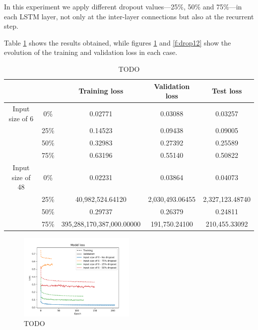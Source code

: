 \documentclass[]{article}
\begin{document}
In this experiment we apply different dropout values---25\%, 50\% and 75\%---in each LSTM layer, not only at the inter-layer connections but also at the recurrent step.

Table \ref{t:drop1} shows the results obtained, while figures \ref{f:drop11} and \ref{f:drop12} show the evolution of the training and validation loss in each case.

\begin{table}[H]
	\centering
	\begin{tabular}{@{}ccccc@{}}
		\toprule
		&      & Training loss             & Validation loss & Test loss       \\ \midrule
		Input size of 6  & 0\%  & 0.02771                   & 0.03088         & 0.03257         \\
		& 25\% & 0.14523                   & 0.09438         & 0.09005         \\
		& 50\% & 0.32983                   & 0.27392         & 0.25589         \\
		& 75\% & 0.63196                   & 0.55140         & 0.50822         \\
		\midrule
		Input size of 48 & 0\%  & 0.02231                   & 0.03864         & 0.04073         \\
		& 25\% & 40,982,524.64120          & 2,030,493.06455 & 2,327,123.48740 \\
		& 50\% & 0.29737                   & 0.26379         & 0.24811         \\
		& 75\% & 395,288,170,387,000.00000 & 191,750.24100   & 210,455.33092   \\ \bottomrule
	\end{tabular}
	\caption{TODO}
	\label{t:drop1}
\end{table}

\begin{figure}[H]
	\centering
	\includegraphics[width=0.5\textwidth]{drop11}
	\caption{TODO}
	\label{f:drop11}
\end{figure}
\end{document}
